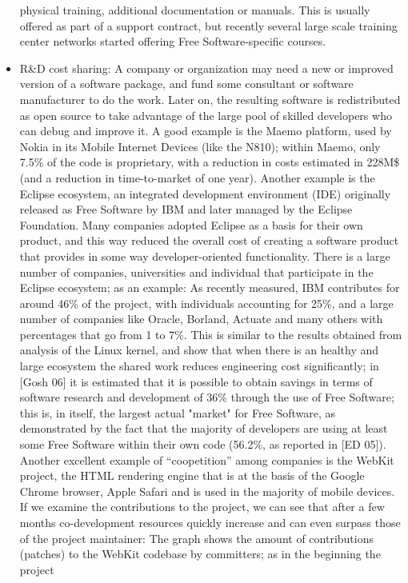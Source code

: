 \begin{itemize}
physical training, additional documentation or manuals. This is usually offered
as part of a support contract, but recently several large scale training center
networks started offering Free Software-specific courses.
 \item R\&D cost sharing: A company or organization may need a new or improved
version of a software package, and fund some consultant or software manufacturer
to do the work. Later on, the resulting software is redistributed as open source
to take advantage of the large pool of skilled developers who can debug and
improve it. A good example is the Maemo platform, used by Nokia in its Mobile
Internet Devices (like the N810); within Maemo, only 7.5\% of the code is
proprietary, with a reduction in costs estimated in 228M\$ (and a reduction in
time-to-market of one year). Another example is the Eclipse ecosystem, an
integrated development environment (IDE) originally released as Free Software by
IBM and later managed by the Eclipse Foundation. Many companies adopted Eclipse
as a basis for their own product, and this way reduced the overall cost of
creating a software product that provides in some way developer-oriented
functionality. There is a large number of companies, universities and individual
that participate in the Eclipse ecosystem; as an example: As
recently measured, IBM contributes for around 46\% of the project, with
individuals accounting for 25\%, and a large number of companies like Oracle,
Borland, Actuate and many others with percentages that go from 1 to 7\%. This is
similar to the results obtained from analysis of the Linux kernel, and show that
when there is an healthy and large ecosystem the shared work reduces engineering
cost significantly; in [Gosh 06] it is estimated that it is possible to obtain
savings in terms of software research and development of 36\% through the use of
Free Software; this is, in itself, the largest actual "market" for Free
Software, as demonstrated by the fact that the majority of developers are using
at least some Free Software within their own code (56.2\%, as reported in [ED
05]). Another excellent example of “coopetition” among companies is the WebKit
project, the HTML rendering engine that is at the basis of the Google Chrome
browser, Apple Safari and is used in the majority of mobile devices. If we
examine the contributions to the project, we can see that after a few months
co-development resources quickly increase and can even surpass those of the
project maintainer:  The graph shows the amount of contributions
(patches) to the WebKit codebase by committers; as in the beginning the project

\end{itemize}
